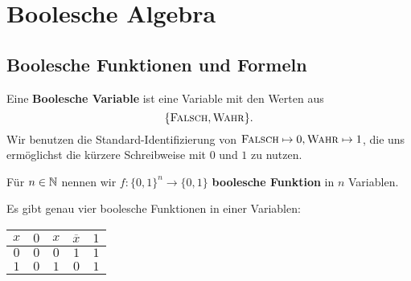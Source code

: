 \chapter{Boolesche Algebra}

\section{Boolesche Funktionen und Formeln} 

\begin{defn}
	Eine \textbf{Boolesche Variable} ist eine Variable mit den Werten aus 
	\[
		\{\mathop{\text{\textsc{Falsch}}},\mathop{\text{\textsc{Wahr}}}\}.
	\] Wir benutzen die Standard-Identifizierung von $\mathop{\text{\textsc{Falsch}}} \mapsto 0, \mathop{\text{\textsc{Wahr}}} \mapsto 1$, die uns ermöglichst die kürzere Schreibweise mit $0$ und $1$ zu nutzen. 
\end{defn} 

\begin{defn}
	Für $n \in \mathbb{N}$ nennen wir $f: \{0,1\}^n \to \{0,1\}$ \textbf{boolesche Funktion} in $n$ Variablen. 
\end{defn} 

\begin{bem} Es gibt genau vier boolesche Funktionen in einer Variablen: 
	\begin{center}
			\begin{tabular}{c|cccc}
				$x$ & $0$ & $x$  & $\overline{x}$ & $1$ 
				\\ \hline 
				$0$ & $0$ & $0$ &  $1$ & $1$
				\\ $1$ & $0$ & $1$ & $0$ & $1$ 
			\end{tabular} 
	\end{center} 
\end{bem} 

